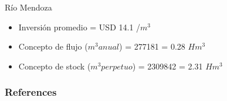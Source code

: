 \documentclass{beamer}\usepackage[]{graphicx}\usepackage[]{color}
\begin{document}
\begin{frame}{Río Mendoza}
  \begin{itemize}
  \item Inversión promedio = USD 
14.1
/$m^3$

\pause \item Concepto de flujo ($m^3 anual$) = 
277181
=
0.28
$Hm^3$
\pause \item Concepto de stock ($m^3 perpetuo$) = 
2309842
=
2.31
$Hm^3$
\end{itemize}
\end{frame}




\begin{frame}[allowframebreaks]
        \frametitle{References}
        \begin{scriptsize}
       
        \end{scriptsize}
\end{frame}
\end{document}
